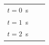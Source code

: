 {{\begin{center}
\begin{tabular}[t]{|l|l|l|}
        \begin{math}t=0\end{math}~s &
    
    
         &
    
    
     \tabularnewline\cline{1-1}\cline{2-2}\cline{3-3}
    
    
        \begin{math}t=1\end{math}~s &
    
    
         &
    
    
     \tabularnewline\cline{1-1}\cline{2-2}\cline{3-3}
    
    
        \begin{math}t=2\end{math}~s &
    
    
         &
    

\end{tabular}
\end{center}}}
